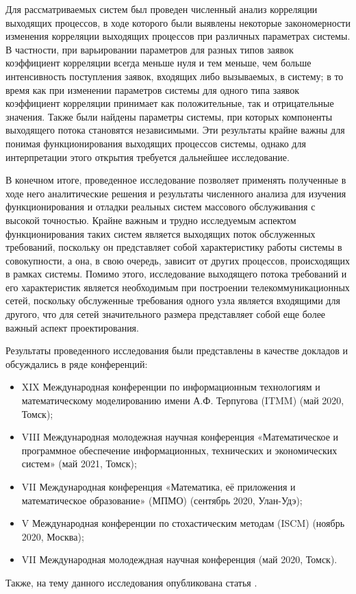 Для рассматриваемых систем был проведен численный анализ корреляции выходящих процессов, в ходе которого были выявлены некоторые закономерности изменения корреляции выходящих процессов при различных параметрах системы. В частности, при варьировании параметров для разных типов заявок коэффициент корреляции всегда меньше нуля и тем меньше, чем больше интенсивность поступления заявок, входящих либо вызываемых, в систему; в то время как при изменении параметров системы для одного типа заявок коэффициент корреляции принимает как положительные, так и отрицательные значения. Также были найдены параметры системы, при которых компоненты выходящего потока становятся независимыми. Эти результаты крайне важны для понимая функционирования выходящих процессов системы, однако для интерпретации этого открытия требуется дальнейшее исследование.

В конечном итоге, проведенное исследование позволяет применять полученные в ходе него аналитические решения и результаты численного анализа  для изучения функционирования и отладки реальных систем массового обслуживания \cite{deering1991icmp,nutt1982performance} с высокой точностью. Крайне важным и трудно исследуемым аспектом функционирования таких систем является выходящих поток обслуженных требований, поскольку он представляет собой характеристику работы системы в совокупности, а она, в свою очередь, зависит от других процессов, происходящих в рамках системы. Помимо этого, исследование выходящего потока требований и его характеристик является необходимым при построении телекоммуникационных сетей, поскольку обслуженные требования одного узла является входящими для другого, что для сетей значительного размера представляет собой еще более важный аспект проектирования.

Результаты проведенного исследования были представлены в качестве докладов и обсуждались в ряде конференций:
\begin{itemize}
\item XIX Международная конференции по информационным технологиям и математическому моделированию имени А.Ф. Терпугова (ITMM) (май 2020, Томск);
\item VIII Международная молодежная научная конференция «Математическое и программное обеспечение информационных, технических и экономических систем» (май 2021, Томск);
\item VII Международная конференция «Математика, её приложения и математическое образование» (МПМО) (сентябрь 2020, Улан-Удэ);
\item V Международная конференции по стохастическим методам (ISCM) (ноябрь 2020, Москва);
\item VII Международная молодеждная научная конференция  (май 2020, Томск).
\end{itemize}
Также, на тему данного исследования опубликована статья \cite{blaginin2020two}.
 \clearpage